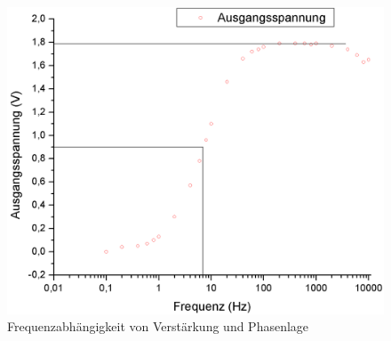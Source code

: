 \documentclass[12pt,a4paper]{article}
\begin{document}
\begin{figure}[H]
	\centering
	\includegraphics[scale=0.5]{./data/frequenzabhaengigkeit.png}
	\caption{Frequenzabhängigkeit von Verstärkung und Phasenlage}
	\label{fig:frequenzabh}
\end{figure}
\end{document}

